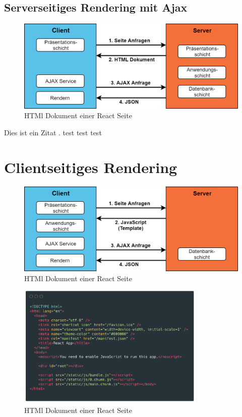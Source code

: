 \documentclass[runningheads]{llncs}
\begin{document}
\subsection{Serverseitiges Rendering mit Ajax}
\label{subsec:Serverseitiges Rendering mit Ajax}

\begin{figure}[h]
  \centering
  \includegraphics[width=12cm]{images/serverajax}
  \caption{HTMl Dokument einer React Seite}
\end{figure}


Dies ist ein Zitat \cite{becker2008a}.
test\cite{IsomorphicApps}
test\cite{SearchFriendly}
test\cite{chen_chen_2016}

\newpage

\section{Clientseitiges Rendering}
\label{sec:Clientseitiges Rendering}

\begin{figure}[h]
  \centering
  \includegraphics[width=12cm]{images/client}
  \caption{HTMl Dokument einer React Seite}
\end{figure}

\begin{figure}[h]
  \centering
  \includegraphics[width=9cm]{images/react-code-small}
  \caption{HTMl Dokument einer React Seite}
\end{figure}
\end{document}
